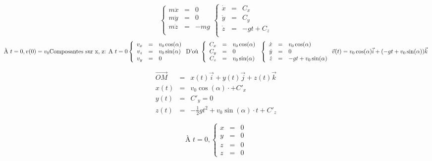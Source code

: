 \[\left\{
		\begin{array}{rcl}
			m\ddot{x} &=& 0 \\
			m\ddot{y} &=& 0 \\
			m\ddot{z} &=& -mg \\
		\end{array}\right.
		\left\{
		\begin{array}{rcl}
			\dot{x} &=& C_x \\
			\dot{y} &=& C_y \\
			\dot{z} &=& -gt + C_z \\
		\end{array}\right.
	\]
	\[\text{À } t=0 , v(0) = v_0 ~\\
	\text{Composantes sur x, z: } ~\\
	\text{A } t = 0 \left\{
		\begin{array}{rcl}
			v_x &=& v_0 \cos(\alpha) \\
			v_z &=& v_0 \sin(\alpha) \\
			v_y &=& 0 \end{array} \right.
			\text{D'où } 
		\left\{
		\begin{array}{rcl}
				C_x &=& v_0 \cos(\alpha) \\
				C_y &=& 0 \\
				C_z &=& v_0 \sin(\alpha) \end{array}\right. ~\\
		\left\{ \begin{array}{rcl}
				\dot{x} &=& v_0 \cos (\alpha) \\
				\dot{y} &=& 0 \\
				\dot{z} &=& -gt + v_0 \sin(\alpha) \end{array}\right. ~\\
		\vec{v}(t) = v_0\cos(\alpha)\vec{i} + (-gt+v_0\sin(\alpha))\vec{k}\] 

\[\begin{array}{rcl}
		\overrightarrow{OM} &=& x(t)\vec{i} + y(t) \vec{j} + z(t) \vec{k} \\
		x(t) &=& v_0\cos(\alpha) \cdot + C'_x \\
		y(t) &=& C'_y = 0 \\
z(t) &=& -\frac{1}{2}gt^2 + v_0 \sin(\alpha)\cdot t + C'_z \end{array}\]

		\[\text{À } t=0,
			\left\{ \begin{array}{rcl}
			x &=& 0 \\
			y &=& 0 \\
			z &=& 0 \\
			z &=& 0\end{array}\right.\]


